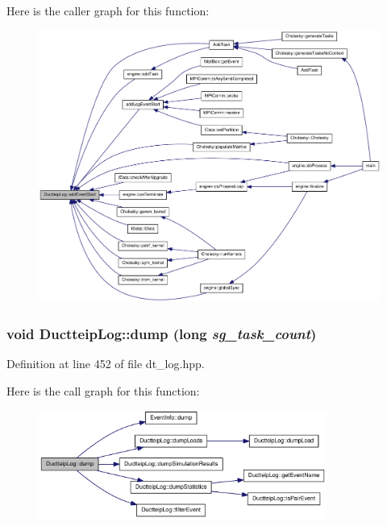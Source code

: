 Here is the caller graph for this function:\nopagebreak
\begin{figure}[H]
\begin{center}
\leavevmode
\includegraphics[width=418pt]{class_ductteip_log_a6d0afadbba975c706ef756a3ba23fe47_icgraph}
\end{center}
\end{figure}
\hypertarget{class_ductteip_log_ade6cb12a251c5e220725999980b16566}{
\subsubsection[{dump}]{\setlength{\rightskip}{0pt plus 5cm}void DuctteipLog::dump (long {\em sg\_\-task\_\-count})}}
\label{class_ductteip_log_ade6cb12a251c5e220725999980b16566}


Definition at line 452 of file dt\_\-log.hpp.

Here is the call graph for this function:\nopagebreak
\begin{figure}[H]
\begin{center}
\leavevmode
\includegraphics[width=268pt]{class_ductteip_log_ade6cb12a251c5e220725999980b16566_cgraph}
\end{center}
\end{figure}


